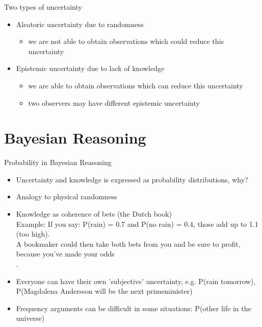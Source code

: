 \documentclass[10pt]{beamer}
\begin{document}
\begin{frame}{Two types of uncertainty}

  \begin{itemize}
  \item Aleatoric uncertainty due to randomness
    \begin{itemize}
    \item<1-> we are not able to obtain observations which could reduce
      this uncertainty
    \end{itemize}
    \vspace{\baselineskip}
  \item Epistemic uncertainty due to lack of knowledge
    \begin{itemize}
    \item<2-> we are able to obtain observations which can reduce
      this uncertainty
    \item<3-> two observers may have different epistemic uncertainty
    \end{itemize}
  \end{itemize}
\end{frame}


\section{Bayesian Reasoning}
\frame{\sectionpage}

\begin{frame}{Probability in Bayesian Reasoning}

  \begin{itemize}
  \item Uncertainty and knowledge is expressed as probability distributions, why? \pause
    \item Analogy to physical randomness
    \item Knowledge as coherence of bets (the Dutch book)
     \\ Example: If you say: P(rain) = 0.7 and P(no rain) = 0.4, those add up to 1.1 (too high).\\
A bookmaker could then take both bets from you and be sure to profit, because you’ve made your odds \\ .
  \pause
  \item Everyone can have their own 'subjective' uncertainty, e.g.  P(rain tomorrow), P(Magdalena Andersson will be the next primeminister)
  \item Frequency arguments can be difficult in some situations: P(other life in the universe)
  \end{itemize}
\end{frame}
\end{document}
